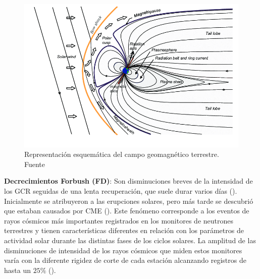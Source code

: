 \begin{figure}
    \centering
    \includegraphics[width=0.7\linewidth]{Figs/Schematic-representation-of-the-near-Earths-magnetosphere.png}
    \caption{Representación esquemática del campo geomagnético terrestre. Fuente \cite{tenerani_2012}}
    \label{magnetosfera}
\end{figure}
\textbf{Decrecimientos Forbush (FD)}: Son disminuciones breves de la intensidad de los GCR seguidas de una lenta recuperación, que suele durar varios días (\cite{forbush_1954}). Inicialmente se atribuyeron a las erupciones solares, pero más tarde se descubrió que estaban causados por CME (\cite{lingri_2016}). Este fenómeno corresponde a los eventos de rayos cósmicos más importantes registrados en los monitores de neutrones terrestres y tienen características diferentes en relación con los parámetros de actividad solar durante las distintas fases de los ciclos solares. La amplitud de las disminuciones de intensidad de los rayos cósmicos que miden estos monitores varía con la diferente rigidez de corte de cada estación alcanzando registros de hasta un $25\%$ (\cite{cane2000}).

